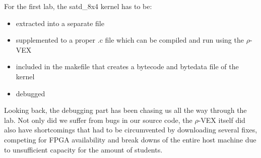 For the first lab, the satd\_8x4 kernel has to be:
\begin{itemize}
	\item extracted into a separate file
	\item supplemented to a proper .c file which can be compiled and run using the $\rho$-VEX
	\item included in the makefile that creates a bytecode and bytedata file of the kernel
	\item debugged
\end{itemize}

Looking back, the debugging part has been chasing us all the way through the lab. Not only did we suffer from bugs in our source code, the $\rho$-VEX itself did also have shortcomings that had to be circumvented by downloading several fixes, competing for FPGA availability and break downs of the entire host machine due to unsufficient capacity for the amount of students.

